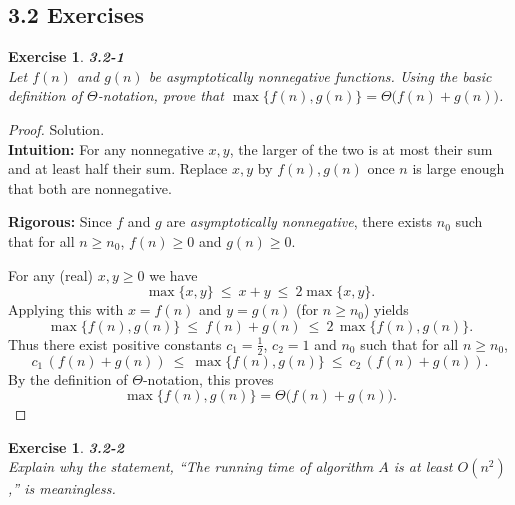 \documentclass[12pt]{article}
\newtheorem{exercise}[theorem]{Exercise}
\theoremstyle{definition}
\begin{document}
\newpage

\subsection*{3.2 Exercises}

\begin{exercise}
\noindent
\textbf{3.2-1} \\
Let $f(n)$ and $g(n)$ be asymptotically nonnegative functions. Using the basic
definition of $\Theta$-notation, prove that $\max\{f(n),g(n)\}=\Theta\!\big(f(n)+g(n)\big)$.
\end{exercise}

\begin{proof}
Solution. \\

\noindent
\textbf{Intuition:}  
For any nonnegative $x,y$, the larger of the two is at most their sum and at least
half their sum. Replace $x,y$ by $f(n),g(n)$ once $n$ is large enough that both are
nonnegative.

\noindent
\textbf{Rigorous:}  
Since $f$ and $g$ are \emph{asymptotically nonnegative}, there exists $n_0$ such that
for all $n\ge n_0$, $f(n)\ge 0$ and $g(n)\ge 0$.

For any (real) $x,y\ge 0$ we have
\[
\max\{x,y\}\ \le\ x+y\ \le\ 2\max\{x,y\}.
\]
Applying this with $x=f(n)$ and $y=g(n)$ (for $n\ge n_0$) yields
\[
\max\{f(n),g(n)\}\ \le\ f(n)+g(n)\ \le\ 2\,\max\{f(n),g(n)\}.
\]
Thus there exist positive constants $c_1= \tfrac12$, $c_2=1$ and $n_0$ such that for all
$n\ge n_0$,
\[
c_1\,(f(n)+g(n))\ \le\ \max\{f(n),g(n)\}\ \le\ c_2\,(f(n)+g(n)).
\]
By the definition of $\Theta$-notation, this proves
\[
\max\{f(n),g(n)\}=\Theta\!\big(f(n)+g(n)\big).
\]
\end{proof}

\newpage

\begin{exercise}
\noindent
\textbf{3.2-2} \\
Explain why the statement, ``The running time of algorithm $A$ is at least $O(n^2)$,'' is meaningless.
\end{exercise}
\end{document}
